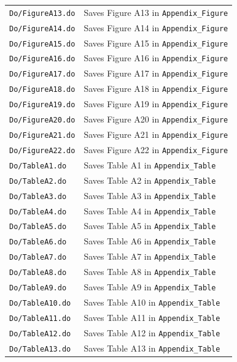 \documentclass[12pt,notitlepage]{article}
\begin{document}
\begin{table}
{\begin{tabular}{ll}
\texttt{Do/FigureA13.do}   & Saves Figure A13 in \texttt{Appendix\_Figure}\\
\texttt{Do/FigureA14.do}   & Saves Figure A14 in \texttt{Appendix\_Figure}\\
\texttt{Do/FigureA15.do}   & Saves Figure A15 in \texttt{Appendix\_Figure}\\
\texttt{Do/FigureA16.do}   & Saves Figure A16 in \texttt{Appendix\_Figure}\\
\texttt{Do/FigureA17.do}   & Saves Figure A17 in \texttt{Appendix\_Figure}\\
\texttt{Do/FigureA18.do}   & Saves Figure A18 in \texttt{Appendix\_Figure}\\
\texttt{Do/FigureA19.do}   & Saves Figure A19 in \texttt{Appendix\_Figure}\\
\texttt{Do/FigureA20.do}   & Saves Figure A20 in \texttt{Appendix\_Figure}\\
\texttt{Do/FigureA21.do}   & Saves Figure A21 in \texttt{Appendix\_Figure}\\
\texttt{Do/FigureA22.do}   & Saves Figure A22 in \texttt{Appendix\_Figure}\\
\texttt{Do/TableA1.do}  & Saves Table A1 in \texttt{Appendix\_Table}\\
\texttt{Do/TableA2.do}  & Saves Table A2 in \texttt{Appendix\_Table}\\
\texttt{Do/TableA3.do}  & Saves Table A3 in \texttt{Appendix\_Table}\\
\texttt{Do/TableA4.do}   & Saves Table A4 in \texttt{Appendix\_Table}\\
\texttt{Do/TableA5.do}   & Saves Table A5 in \texttt{Appendix\_Table}\\
\texttt{Do/TableA6.do}   & Saves Table A6 in \texttt{Appendix\_Table}\\
\texttt{Do/TableA7.do}   & Saves Table A7 in \texttt{Appendix\_Table}\\
\texttt{Do/TableA8.do}   & Saves Table A8 in \texttt{Appendix\_Table}\\
\texttt{Do/TableA9.do}   & Saves Table A9 in \texttt{Appendix\_Table}\\
\texttt{Do/TableA10.do}   & Saves Table A10 in \texttt{Appendix\_Table}\\
\texttt{Do/TableA11.do}   & Saves Table A11 in \texttt{Appendix\_Table}\\
\texttt{Do/TableA12.do}  & Saves Table A12 in \texttt{Appendix\_Table}\\
\texttt{Do/TableA13.do}  & Saves Table A13 in \texttt{Appendix\_Table}\\

\end{tabular}}
\end{table}
\end{document}
